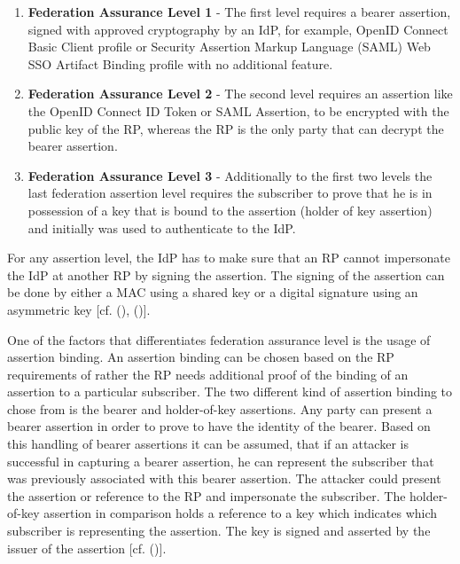\begin{enumerate}
	\item \textbf{Federation Assurance Level 1}  - The first level requires a bearer assertion,
	signed with approved cryptography by an IdP, for example, OpenID Connect
	Basic Client profile or Security Assertion Markup Language (SAML) Web SSO
	Artifact Binding profile with no additional feature.
	
	\item \textbf{Federation Assurance Level 2} - The second level requires an assertion like the
	OpenID Connect ID Token or SAML Assertion, to be encrypted with the public
	key of the RP, whereas the RP is the only party that can decrypt the bearer
	assertion.
	
	\item \textbf{Federation Assurance Level 3} - Additionally to the first two levels the last federation assertion level requires the subscriber to prove that he is in possession of a key that is bound to the assertion (holder of key assertion) and initially was used to authenticate to the IdP. 
	
\end{enumerate}
For any assertion level, the IdP has to make sure that an RP cannot impersonate the IdP at another RP by signing the assertion. The signing of the assertion can be done by either a MAC using a shared key or a digital signature using an asymmetric key [cf. (\cite{NIST:2017:DIG}), (\cite{NIST:2017:DIGFA})].  

One of the factors that differentiates federation assurance level is the usage of assertion binding. An assertion binding can be chosen based on the RP requirements of rather the RP needs additional proof of the binding of an assertion to a particular subscriber. The two different kind of assertion binding to chose from is the bearer and holder-of-key assertions. Any party can present a bearer assertion in order to prove to have the identity of the bearer. Based on this handling of bearer assertions it can be assumed, that if an attacker is successful in capturing a bearer assertion, he can represent the subscriber that was previously associated with this bearer assertion. The attacker could present the assertion or reference to the RP and impersonate the subscriber. The holder-of-key assertion in comparison holds a reference to a key which indicates which subscriber is representing the assertion. The key is signed and asserted by the issuer of the assertion  [cf. (\cite{NIST:2017:DIGFA})].

